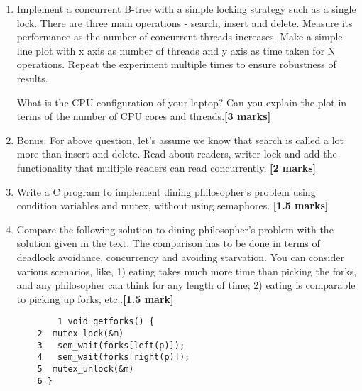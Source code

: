\documentclass[]{article}
\begin{document}
\begin{enumerate}
	\item Implement a concurrent B-tree with a simple locking
	strategy such as a single lock. There are three main operations - search, insert and delete. Measure its performance as the number of
	concurrent threads increases. Make a simple line plot with x axis as number of threads and y axis as time taken for N operations. Repeat the experiment multiple times to ensure robustness of results.
	
	What is the CPU configuration of your laptop? Can you explain the plot in terms of the number of CPU cores and threads.\textbf{[3 marks]}
	
	\item Bonus: For above question, let's assume we know that search is called a lot more than insert and delete. Read about readers, writer lock and add the functionality that multiple readers can read concurrently.  \textbf{[2 marks]}
	
	\item Write a C program to implement dining philosopher's problem using condition variables and mutex, without using semaphores. \textbf{[1.5 marks]}
	
	\item 	Compare the following solution to dining philosopher's problem with the solution given in the text. The comparison has to be done in terms of deadlock avoidance, concurrency and avoiding starvation. You can consider various scenarios, like, 1) eating takes much more time than picking the forks, and any philosopher can think for any length of time; 2) eating is comparable to picking up forks, etc..\textbf{[1.5 mark]}
	
	\begin{verbatim}
		1 void getforks() { 
	2  mutex_lock(&m)
	3   sem_wait(forks[left(p)]); 
	4   sem_wait(forks[right(p)]); 
	5  mutex_unlock(&m)
	6 } 	

	\end{verbatim}  
	 
\end{enumerate}
\end{document}
